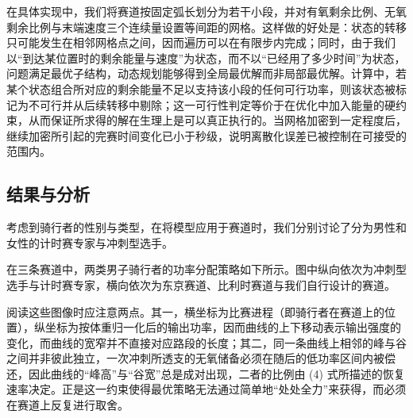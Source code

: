 \documentclass[11pt,a4paper]{ctexart}
\begin{document}
在具体实现中，我们将赛道按固定弧长划分为若干小段，并对有氧剩余比例、无氧剩余比例与末端速度三个连续量设置等间距的网格。这样做的好处是：状态的转移只可能发生在相邻网格点之间，因而遍历可以在有限步内完成；同时，由于我们以“到达某位置时的剩余能量与速度”为状态，而不以“已经用了多少时间”为状态，问题满足最优子结构，动态规划能够得到全局最优解而非局部最优解。计算中，若某个状态组合所对应的剩余能量不足以支持该小段的任何可行功率，则该状态被标记为不可行并从后续转移中剔除；这一可行性判定等价于在优化中加入能量的硬约束，从而保证所求得的解在生理上是可以真正执行的。当网格加密到一定程度后，继续加密所引起的完赛时间变化已小于秒级，说明离散化误差已被控制在可接受的范围内。

\subsection{结果与分析}

考虑到骑行者的性别与类型，在将模型应用于赛道时，我们分别讨论了分为男性和女性的计时赛专家与冲刺型选手。

在三条赛道中，两类男子骑行者的功率分配策略如下所示。图中纵向依次为冲刺型选手与计时赛专家，横向依次为东京赛道、比利时赛道与我们自行设计的赛道。

阅读这些图像时应注意两点。其一，横坐标为比赛进程（即骑行者在赛道上的位置），纵坐标为按体重归一化后的输出功率，因而曲线的上下移动表示输出强度的变化，而曲线的宽窄并不直接对应路段的长度；其二，同一条曲线上相邻的峰与谷之间并非彼此独立，一次冲刺所透支的无氧储备必须在随后的低功率区间内被偿还，因此曲线的“峰高”与“谷宽”总是成对出现，二者的比例由 (4) 式所描述的恢复速率决定。正是这一约束使得最优策略无法通过简单地“处处全力”来获得，而必须在赛道上反复进行取舍。
\end{document}
